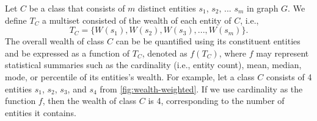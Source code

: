 Let \(C\) be a class that consists of \(m\) distinct entities \(s_1\), \(s_2\), ... \(s_m\) in graph \(G\). We define \(T_C\) a multiset consisted of the wealth of each entity of \(C\), i.e., \[T_C = \{W(s_1), W(s_2), W(s_3), ..., W(s_m)\}.\] The overall wealth of class \(C\) can be be quantified using its constituent entities and be expressed as a function of \(T_C\), denoted as \(f(T_C)\), where \(f\) may represent statistical summaries such as the cardinality (i.e., entity count), mean, median, mode, or percentile of its entities's wealth. For example, let a class \(C\) consists of 4 entities  \(s_1\), \(s_2\), \(s_3\), and \(s_4\) from \autoref{fig:wealth-weighted}. If we use cardinality as the function \(f\), then the wealth of class \(C\) is 4, corresponding to the number of entities it contains.